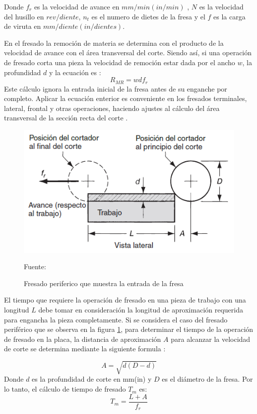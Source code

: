 Donde $f_{r}$ es la velocidad de avance en $mm/min (in/min)$ , $N$ es la velocidad del husillo en $rev/diente$, $n_{t}$  es el numero de dietes de la fresa y el $f$ es la carga de viruta en $mm/diente(in/dientes)$. 

En el fresado la remoción de materia se determina con el producto de la velocidad de avance con el área transversal del corte. Siendo así, si una operación de fresado corta una pieza la velocidad de remoción estar dada por el ancho $w$, la profundidad $d$ y la ecuación es \citep{groover2007fundamentals}:
\begin{equation}
    R_{MR}=w d f_{r}
\end{equation}
Este cálculo ignora la entrada inicial de la fresa antes de su enganche por completo. Aplicar la ecuación enterior es conveniente en los fresados terminales, lateral, frontal y otras operaciones, haciendo ajustes al cálculo del área transversal de la sección recta del corte \citep{groover2007fundamentals}.

\begin{figure}[hbt]
        \centering
        \includegraphics[width=0.6\linewidth]{Cap1_FormulaciondelProyecto/Figuras/fresadaPentrada.PNG}
    \caption{Fresado periferico que muestra la entrada de la fresa}{Fuente: \citep{groover2007fundamentals}}
    \label{fig:fresadaPentrada}
\end{figure}

El tiempo que requiere la operación de fresado en una pieza de trabajo con una longitud $L$ debe tomar en consideración la longitud de aproximación requerida para engancha la pieza completamente. Si se considera el caso del fresado periférico que se observa en la figura \ref{fig:fresadaPentrada}, para determinar el tiempo de la operación de fresado en la placa, la distancia de aproximación $A$ para alcanzar la velocidad de corte se determina mediante la siguiente formula \citep{groover2007fundamentals}:

\begin{equation}
    A=\sqrt{d(D-d)}
\end{equation}
Donde $d$ es la profundidad de corte en mm(in) y $D$ es el diámetro de la fresa. Por lo tanto, el cálculo de tiempo de fresado $T_{m}$ es:
\begin{equation}
    T_{m}=\frac{L+A}{f_{r}}
\end{equation}

